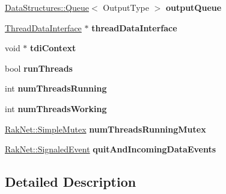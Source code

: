 \begin{DoxyCompactItemize}
\item 
\hypertarget{struct_thread_pool_a6b76ae04819bd8b15bae573217b15735}{\hyperlink{class_data_structures_1_1_queue}{Data\-Structures\-::\-Queue}$<$ Output\-Type $>$ {\bfseries output\-Queue}}\label{struct_thread_pool_a6b76ae04819bd8b15bae573217b15735}

\item 
\hypertarget{struct_thread_pool_af5e51a5c831a7dc16b0dad34203790b0}{\hyperlink{class_thread_data_interface}{Thread\-Data\-Interface} $\ast$ {\bfseries thread\-Data\-Interface}}\label{struct_thread_pool_af5e51a5c831a7dc16b0dad34203790b0}

\item 
\hypertarget{struct_thread_pool_a5e346620f540fa4791d9916e51513b1d}{void $\ast$ {\bfseries tdi\-Context}}\label{struct_thread_pool_a5e346620f540fa4791d9916e51513b1d}

\item 
\hypertarget{struct_thread_pool_a6d53166bc98ac94b11d2f9346f8d61b2}{bool {\bfseries run\-Threads}}\label{struct_thread_pool_a6d53166bc98ac94b11d2f9346f8d61b2}

\item 
\hypertarget{struct_thread_pool_afa44d9d22aaa0b45008a146d3d99dd22}{int {\bfseries num\-Threads\-Running}}\label{struct_thread_pool_afa44d9d22aaa0b45008a146d3d99dd22}

\item 
\hypertarget{struct_thread_pool_a31406cbf875ff36d9d0c5ba6207382c3}{int {\bfseries num\-Threads\-Working}}\label{struct_thread_pool_a31406cbf875ff36d9d0c5ba6207382c3}

\item 
\hypertarget{struct_thread_pool_a185d59aca67ec7d8e57f7a2abad94a24}{\hyperlink{class_rak_net_1_1_simple_mutex}{Rak\-Net\-::\-Simple\-Mutex} {\bfseries num\-Threads\-Running\-Mutex}}\label{struct_thread_pool_a185d59aca67ec7d8e57f7a2abad94a24}

\item 
\hypertarget{struct_thread_pool_a03b8e31b094c460ba9b119a6a515ea40}{\hyperlink{class_rak_net_1_1_signaled_event}{Rak\-Net\-::\-Signaled\-Event} {\bfseries quit\-And\-Incoming\-Data\-Events}}\label{struct_thread_pool_a03b8e31b094c460ba9b119a6a515ea40}

\end{DoxyCompactItemize}


\subsection{Detailed Description}
